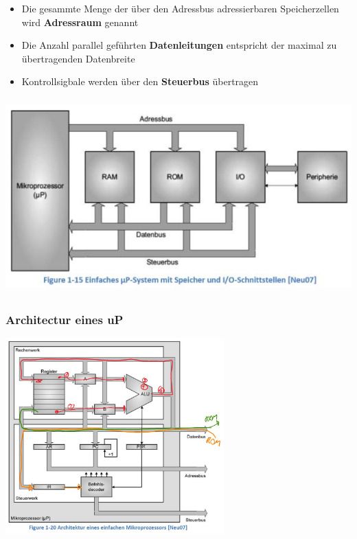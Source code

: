 \begin{itemize}
    \item Die gesammte Menge der über den Adressbus adressierbaren Speicherzellen wird \textbf{Adressraum} genannt
    \item Die Anzahl parallel geführten \textbf{Datenleitungen} entspricht der maximal zu übertragenden Datenbreite
    \item Kontrollsigbale werden über den \textbf{Steuerbus} übertragen
\end{itemize}
    \includegraphics[height=7.5cm]{images/SimpleuPSystem}
    
\subsubsection{Architectur eines uP}
    \includegraphics[height=7.5cm]{images/ArchitectuP}\\
    
